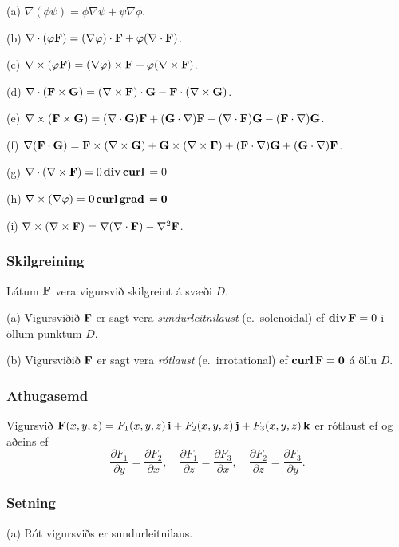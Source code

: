 (a) $\nabla(\phi\psi)=\phi\nabla\psi+\psi\nabla\phi$.

(b)  $\nabla\cdot(\phi\Fv)=(\nabla\phi)\cdot\Fv+\phi(\nabla\cdot\Fv)$.

(c) $\nabla\times(\phi\Fv)=(\nabla\phi)\times\Fv+\phi(\nabla\times\Fv)$. 

(d)  $\nabla\cdot(\Fv\times\Gv)=(\nabla\times\Fv)\cdot\Gv
-\Fv\cdot(\nabla\times\Gv)$.

(e) $\nabla\times(\Fv\times\Gv)=(\nabla\cdot\Gv)\Fv
+(\Gv\cdot\nabla)\Fv-(\nabla\cdot\Fv)\Gv-(\Fv\cdot\nabla)\Gv$.

(f) $\nabla(\Fv\cdot\Gv)=\Fv\times(\nabla\times \Gv)+\Gv\times(\nabla\times \Fv)+(\Fv\cdot\nabla)\Gv+(\Gv\cdot\nabla)\Fv$.

(g) $\nabla\cdot(\nabla\times \Fv)=0$\qquad\qquad$\dive\curl=0$

(h) $\nabla\times(\nabla\phi)=\ov$\qquad\qquad$\curl\grad=\ov$

(i)  $\nabla\times(\nabla\times \Fv)=\nabla(\nabla\cdot\Fv)-\nabla^2\Fv$.




\subsubsection{Skilgreining \rtask{}}
 Látum $\Fv$ vera vigursvið skilgreint á svæði $D$.  

(a) Vigursviðið $\Fv$ er sagt vera {\em sundurleitnilaust}
(e.~solenoidal) ef $\dive\Fv=0$ i öllum punktum  $D$.

(b) Vigursviðið $\Fv$ er sagt vera {\em rótlaust} (e.~irrotational) ef $\curl\Fv=\ov$ á öllu $D$.
    


\subsubsection{Athugasemd \rtask{}}
 Vigursvið   $\Fv(x,y,z)=F_1(x,y,z)\,\iv+F_2(x,y,z)\,\jv+F_3(x,y,z)\,\kv$ er rótlaust ef og aðeins ef 
$$\frac{\partial F_1}{\partial y}=
\frac{\partial F_2}{\partial x},\quad
\frac{\partial F_1}{\partial z}=
\frac{\partial F_3}{\partial x},\quad
\frac{\partial F_2}{\partial z}=
\frac{\partial F_3}{\partial y}.$$




\subsubsection{Setning \rtask{}}
 (a) Rót vigursviðs er sundurleitnilaus.

